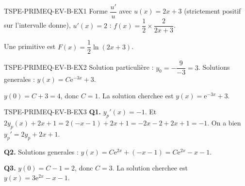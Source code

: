 \begin{corrige}{TSPE-PRIMEQ-EV-B-EX1}
Forme $\dfrac{u'}{u}$ avec $u(x)=2x+3$ (strictement positif sur l'intervalle donne), $u'(x)=2$ : $f(x) = \dfrac{1}{2} \times \dfrac{2}{2x+3}$.

Une primitive est $\boxed{F(x) = \dfrac{1}{2}\ln(2x+3)}$.
\end{corrige}

\begin{corrige}{TSPE-PRIMEQ-EV-B-EX2}
Solution particulière : $y_0 = -\dfrac{9}{-3} = 3$. Solutions generales : $y(x) = C\mathrm{e}^{-3x}+3$.

$y(0) = C+3=4$, donc $C=1$. La solution cherchee est $y(x) = \mathrm{e}^{-3x}+3$.
\end{corrige}

\begin{corrige}{TSPE-PRIMEQ-EV-B-EX3}
\textbf{Q1.} $y_p'(x) = -1$. Et $2y_p(x)+2x+1 = 2(-x-1)+2x+1 = -2x-2+2x+1=-1$. On a bien $y_p'=2y_p+2x+1$. \checkmark

\textbf{Q2.} Solutions generales : $y(x) = C\mathrm{e}^{2x} + (-x-1) = C\mathrm{e}^{2x}-x-1$.

\textbf{Q3.} $y(0) = C-1=2$, donc $C=3$. La solution cherchee est $y(x) = 3\mathrm{e}^{2x}-x-1$.
\end{corrige}
